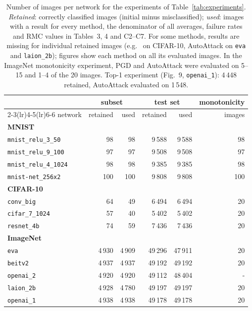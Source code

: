 \begin{table}[tbp]
  \centering
  \caption{Number of images per network for the experiments of Table~\ref{tab:experiments}. \emph{Retained}: correctly classified images (initial minus misclassified); \emph{used}: images with a result for every method, the denominator of all averages, failure rates and RMC values in Tables~3, 4 and C2--C7. For some methods, results are missing for individual retained images (e.g.\ \abcrown{} on CIFAR-10, AutoAttack on \texttt{eva} and \texttt{laion\_2b}); figures show each method on all its evaluated images. In the ImageNet monotonicity experiment, PGD and AutoAttack were evaluated on 5--15 and 1--4 of the 20 images. Top-1 experiment (Fig.~9, \texttt{openai\_1}): 4\,448 retained, AutoAttack evaluated on 1\,548.}
  \label{tab:sample_sizes}
  \small
  \begin{tabular}{lrrrrr}
  \toprule
  & \multicolumn{2}{c}{subset} & \multicolumn{2}{c}{test set} & monotonicity \\
  \cmidrule(lr){2-3}\cmidrule(lr){4-5}\cmidrule(lr){6-6}
  network & retained & used & retained & used & images \\
  \midrule
  \multicolumn{6}{l}{\textbf{MNIST}} \\
  \texttt{mnist\_relu\_3\_50} & 98 & 98 & 9\,588 & 9\,588 & 98 \\
  \texttt{mnist\_relu\_9\_100} & 97 & 97 & 9\,508 & 9\,508 & 97 \\
  \texttt{mnist\_relu\_4\_1024} & 98 & 98 & 9\,385 & 9\,385 & 98 \\
  \texttt{mnist-net\_256x2} & 100 & 100 & 9\,808 & 9\,808 & 100 \\
  \midrule
  \multicolumn{6}{l}{\textbf{CIFAR-10}} \\
  \texttt{conv\_big} & 64 & 49 & 6\,494 & 6\,494 & 20 \\
  \texttt{cifar\_7\_1024} & 57 & 40 & 5\,402 & 5\,402 & 20 \\
  \texttt{resnet\_4b} & 74 & 59 & 7\,436 & 7\,436 & 20 \\
  \midrule
  \multicolumn{6}{l}{\textbf{ImageNet}} \\
  \texttt{eva} & 4\,930 & 4\,909 & 49\,296 & 47\,911 & 20 \\
  \texttt{beitv2} & 4\,937 & 4\,937 & 49\,192 & 49\,192 & 20 \\
  \texttt{openai\_2} & 4\,920 & 4\,920 & 49\,112 & 48\,404 & - \\
  \texttt{laion\_2b} & 4\,928 & 4\,780 & 49\,197 & 49\,197 & 20 \\
  \texttt{openai\_1} & 4\,938 & 4\,938 & 49\,178 & 49\,178 & 20 \\
  \bottomrule
  \end{tabular}
\end{table}

